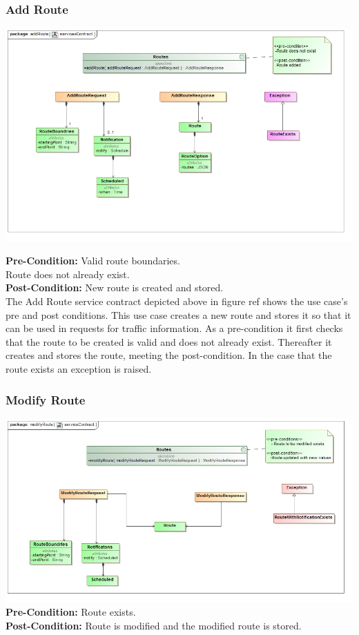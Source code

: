 \documentclass[a4paper,12pt]{article}
\begin{document}
\subsubsection{Add Route}
\includegraphics[width=\textwidth]{images/scAdd_Route.jpg}


\textbf{Pre-Condition: }
Valid route boundaries.\\
Route does not already exist.\\
\textbf{Post-Condition: }
New route is created and stored.\\

The Add Route service contract depicted above in {figure ref} shows the use case's pre and post conditions. This use case creates a new route and stores it so that it can be used in requests for traffic information. As a pre-condition it first checks that the route to be created is valid and does not already exist. Thereafter it creates and stores the route, meeting the post-condition. In the case that the route exists an exception is raised.
\subsubsection{Modify Route} 
\includegraphics[width=\textwidth]{images/scModify_Route.jpg}
\textbf{Pre-Condition: }
Route exists.\\
\textbf{Post-Condition: }
Route is modified and the modified route is stored.\\
\end{document}
